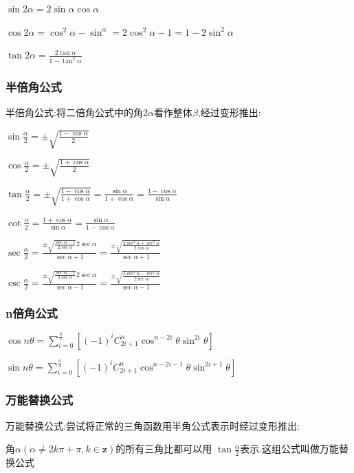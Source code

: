 \documentclass[UTF8]{ctexbook}
\newcommand{\mathCombination}[2]{C_{#1}^{#2}}
\newcommand{\upDownSum}[2]{\sum\limits_{#2}^{#1}}
\begin{document}
{{{{    $\sin2\alpha = 2\sin\alpha\cos\alpha$

    $\cos2\alpha = \cos^2\alpha - \sin^\alpha = 2\cos^2\alpha - 1 = 1 - 2\sin^2\alpha$

    $\tan2\alpha = \frac{2\tan\alpha}{1 - \tan^2\alpha}$
  }%

  \subsubsection{半倍角公式}{
    半倍角公式:将二倍角公式中的角$2\alpha$看作整体$\beta$,经过变形推出:

    $\sin\frac{\alpha}{2} = \pm\sqrt{\frac{1 - \cos\alpha}{2}}$

    $\cos\frac{\alpha}{2} = \pm\sqrt{\frac{1 + \cos\alpha}{2}}$

    $\tan\frac{\alpha}{2} = \pm\sqrt{\frac{1-\cos\alpha}{1+\cos\alpha}} = \frac{\sin\alpha}{1+\cos\alpha} = \frac{1-\cos\alpha}{\sin\alpha}$

    $\cot\frac{\alpha}{2} = \frac{1+\cos\alpha}{\sin\alpha} = \frac{\sin\alpha}{1-\cos\alpha}$

    $\sec\frac{\alpha}{2} = \frac{\pm\sqrt{\frac{\sec\alpha - 1}{2\sec\alpha}}2\sec\alpha}{\sec\alpha + 1} = \frac{\pm\sqrt{\frac{4\sec^3\alpha + \sec^2\alpha}{2\cos\alpha}}}{\sec\alpha + 1}$

    $\csc\frac{\alpha}{2} = \frac{\pm\sqrt{\frac{\sec\alpha - 1}{2\sec\alpha}}2\sec\alpha}{\sec\alpha - 1} = \frac{\pm\sqrt{\frac{3\sec^3\alpha - \sec^2\alpha}{2\sec\alpha}}}{\sec\alpha - 1}$
  }%

  \subsubsection{n倍角公式}{
    $\cos{n\theta} = \upDownSum{\frac{n}{2}}{i = 0}[(-1)^i\mathCombination{2i + 1}{n}\cos^{n - 2i}\theta\sin^{2i}\theta]$

    $\sin{n\theta} = \upDownSum{\frac{n}{2}}{i = 0}[(-1)^i\mathCombination{2i + 1}{n}\cos^{n - 2i - 1}\theta\sin^{2i+1}\theta]$
  }%

  \subsubsection{万能替换公式}{
    万能替换公式:尝试将正常的三角函数用半角公式表示时经过变形推出:

    角$\alpha(\alpha \neq 2k\pi + \pi ,k \in \mathbf{z})$的所有三角比都可以用 $\tan\frac{\alpha}{2}$表示.这组公式叫做万能替换公式

}}}}
\end{document}
